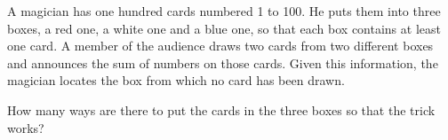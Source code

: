 A magician has one hundred cards 
numbered 1 to 100. He puts them into three boxes, a red one, a white one
 and a blue one, so that each box contains at least one card. A member 
of the audience draws two cards from two different boxes and announces 
the sum of numbers on those cards. Given this information, the magician 
locates the box from which no card has been drawn.

How many ways are there to put the cards in the three boxes so that the trick works?
